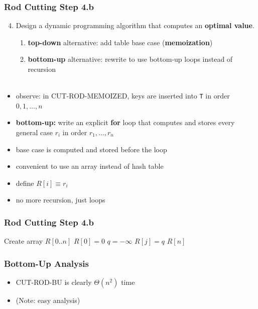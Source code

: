 \documentclass[10pt,aspectratio=169]{beamer}
\newcommand{\stanza}{ \\~\ }
\begin{document}
\begin{frame} \frametitle{Rod Cutting Step 4.b}
  \begin{enumerate}
    \setcounter{enumi}{3}
    \item Design a dynamic programming algorithm that computes an \textbf{optimal value}.
    \begin{enumerate}
      \item \textbf{top-down} alternative: add table base case (\textbf{memoization})
      \item \textbf{bottom-up} alternative: rewrite to use bottom-up loops instead of recursion
      \stanza
    \end{enumerate}
\end{enumerate}

\begin{itemize}
  \item observe: in CUT-ROD-MEMOIZED, keys are inserted into \texttt{T} in order $0, 1, \ldots, n$
  \item \textbf{bottom-up:} write an explicit \textbf{for} loop that computes and stores every general case $r_i$ in order $r_1, \ldots, r_n$
  \item base case is computed and stored before the loop
  \item convenient to use an array instead of hash table
  \item define $R[i] \equiv r_i$
  \item no more recursion, just loops
\end{itemize}
\end{frame}

\begin{frame} \frametitle{Rod Cutting Step 4.b}
  {\small
  \begin{algorithmic}[1]
    \State Create array $R[0..n]$
    \State $R[0] = 0$
      \State $q=-\infty$
      \EndFor
      \State $R[j] = q$
    \EndFor
    \State \Return $R[n]$
    \EndFunction
  \end{algorithmic}
  }
\end{frame}

\begin{frame} \frametitle{Bottom-Up Analysis}
  \begin{itemize}
    \item CUT-ROD-BU is clearly $\Theta(n^2)$ time
    \item (Note: easy analysis)
  \end{itemize}
\end{frame}
\end{document}
